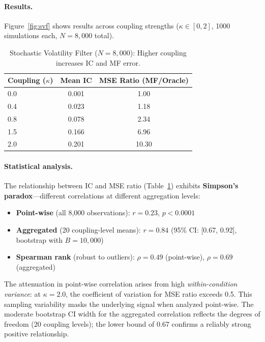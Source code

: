 \documentclass[10pt]{article} %
\theoremstyle{plain}
\theoremstyle{definition}
\begin{document}
\paragraph{Results.} Figure~\ref{fig:svf} shows results across coupling strengths ($\kappa \in [0, 2]$, 1000 simulations each, $N = 8{,}000$ total).

\begin{table}[!htbp]
\centering
\begin{tabular}{lcc}
\toprule
Coupling ($\kappa$) & Mean IC & MSE Ratio (MF/Oracle) \\
\midrule
0.0 & 0.001 & 1.00 \\
0.4 & 0.023 & 1.18 \\
0.8 & 0.078 & 2.34 \\
1.5 & 0.166 & 6.96 \\
2.0 & 0.201 & 10.30 \\
\bottomrule
\end{tabular}
\caption{Stochastic Volatility Filter ($N = 8{,}000$): Higher coupling increases IC and MF error.}
\label{tab:svf}
\end{table}

\paragraph{Statistical analysis.} The relationship between IC and MSE ratio (Table~\ref{tab:svf}) exhibits \textbf{Simpson's paradox}---different correlations at different aggregation levels:

\begin{itemize}
    \item \textbf{Point-wise} (all 8,000 observations): $r = 0.23$, $p < 0.0001$
    \item \textbf{Aggregated} (20 coupling-level means): $r = 0.84$ (95\% CI: [0.67, 0.92], bootstrap with $B = 10{,}000$)
    \item \textbf{Spearman rank} (robust to outliers): $\rho = 0.49$ (point-wise), $\rho = 0.69$ (aggregated)
\end{itemize}

\noindent The attenuation in point-wise correlation arises from high \emph{within-condition variance}: at $\kappa = 2.0$, the coefficient of variation for MSE ratio exceeds 0.5. This sampling variability masks the underlying signal when analyzed point-wise. The moderate bootstrap CI width for the aggregated correlation reflects the degrees of freedom (20 coupling levels); the lower bound of 0.67 confirms a reliably strong positive relationship.
\end{document}
